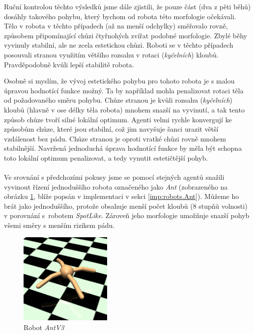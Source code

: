 Ruční kontrolou těchto výsledků jsme dále zjistili, že pouze část (dva z pěti
běhů) dosáhly takového pohybu, který bychom od robota této morfologie
očekávali. Tělo v robota v těchto případech (až na menší odchylky) směřovalo
rovně, způsobem připomínající chůzi čtyřnohých zvířat podobné morfologie. Zbylé
běhy vyvinuly stabilní, ale ne zcela estetickou chůzi. Roboti se v těchto
případech posouvali stranou využitím většího rozsahu v rotaci
(\emph{kyčelních}) kloubů. Pravděpodobně kvůli lepší stabilitě robota.

Osobně si myslím, že vývoj estetického pohybu pro tohoto robota je s malou
úpravou hodnotící funkce možný. Ta by například mohla penalizovat rotaci těla
od požadovaného směru pohybu. Chůze stranou je kvůli rozsahu (\emph{kyčelních})
kloubů (hlavně v ose délky těla robota) mnohem snazší na vyvinutí, a tak tento
způsob chůze tvoří silné lokální optimum. Agenti velmi rychle konvergují ke
způsobům chůze, které jsou stabilní, což jim navyšuje šanci urazit větší
vzdálenost bez pádu. Chůze stranou je oproti vratké chůzi rovně mnohem
stabilnější. Navržená jednoduchá úprava hodnotící funkce by měla být schopna
toto lokální optimum penalizovat, a tedy vynutit estetičtější pohyb.

\paragraph{}
Ve srovnání s předchozími pokusy jsme se pomocí stejných agentů snažili
vyvinout řízení jednoduššího robota označeného jako \emph{Ant} (zobrazeného na
obrázku \ref{fig:robot:ant}, blíže popsán v implementaci v sekci
\ref{imp:robots.Ant}). Můžeme ho brát jako jednoduššího, protože obsahuje menší
počet kloubů (8 stupňů volnosti) v porovnání s~robotem \emph{SpotLike}. Zároveň
jeho morfologie umožňuje snazší pohyb všemi směry s menším rizikem pádu.

\begin{figure}[!htb]
    \centering
    \includegraphics[width=0.4\textwidth]{../img/crop_Ant-v3.jpg}
    \caption{Robot \emph{AntV3}}
    \label{fig:robot:ant}
\end{figure}

